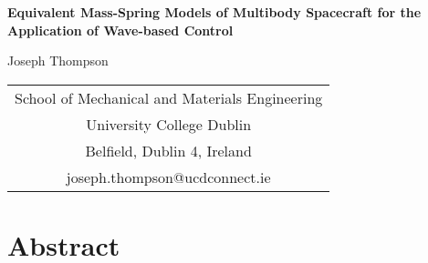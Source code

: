 \documentclass{mbd_fullpaper}
\begin{document}
\newcommand{\heading}[1]{
   {\medskip\hskip5em\bf\large{#1}
   \vskip0.5ex
   }
}
\newcommand{\eqnref}[1]{
  (\ref{#1})
}

\renewcommand{\refname}{\medskip\bf\large References}



\begin{center}
  \Large{\bf
Equivalent Mass-Spring Models of Multibody Spacecraft for the Application of Wave-based Control  }
\end{center}

\begin{center}
\large{
Joseph Thompson
}
\end{center}

{
\begin{center}
 \small
  \begin{tabular}{c}
    School of Mechanical and Materials Engineering \\
    University College Dublin              \\
    Belfield, Dublin 4, Ireland        \\
    joseph.thompson@ucdconnect.ie                        \\
  \end{tabular}
\end{center}
}


\section*{Abstract}
\end{document}
